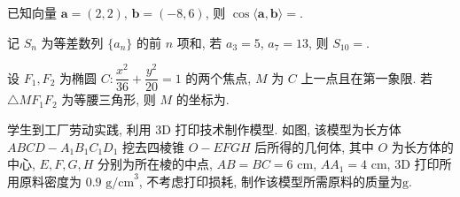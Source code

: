 \begin{question}
已知向量 $\boldsymbol{a} = (2, 2)$, $\boldsymbol{b} = (-8, 6)$, 则 $\cos\langle\boldsymbol{a}, \boldsymbol{b}\rangle =$\gkblank{}.

\end{question}
\begin{question}
记 $S_n$ 为等差数列 $\{a_n\}$ 的前 $n$ 项和, 若 $a_3 = 5$, $a_7 = 13$, 则 $S_{10} =$\gkblank{}.

\end{question}
\begin{question}
设 $F_1, F_2$ 为椭圆 $C: \dfrac{x^2}{36} + \dfrac{y^2}{20} = 1$ 的两个焦点, $M$ 为 $C$ 上一点且在第一象限. 若 $\triangle MF_1F_2$ 为等腰三角形, 则 $M$ 的坐标为\gkblank{}.

\Needspace{0.4\textheight}
\end{question}
\begin{question}
学生到工厂劳动实践, 利用 3D 打印技术制作模型. 如图, 该模型为长方体 $ABCD - A_1B_1C_1D_1$ 挖去四棱锥 $O - EFGH$ 后所得的几何体, 其中 $O$ 为长方体的中心, $E, F, G, H$ 分别为所在棱的中点, $AB = BC = 6\text{ cm}$, $AA_1 = 4\text{ cm}$, 3D 打印所用原料密度为 $0.9\text{ g/cm}^3$, 不考虑打印损耗, 制作该模型所需原料的质量为\gkblank{}$\text{g}$.
\nopagebreak[4]
\begin{center}\end{center}
\nopagebreak[4]
\par\medskip

\end{question}



